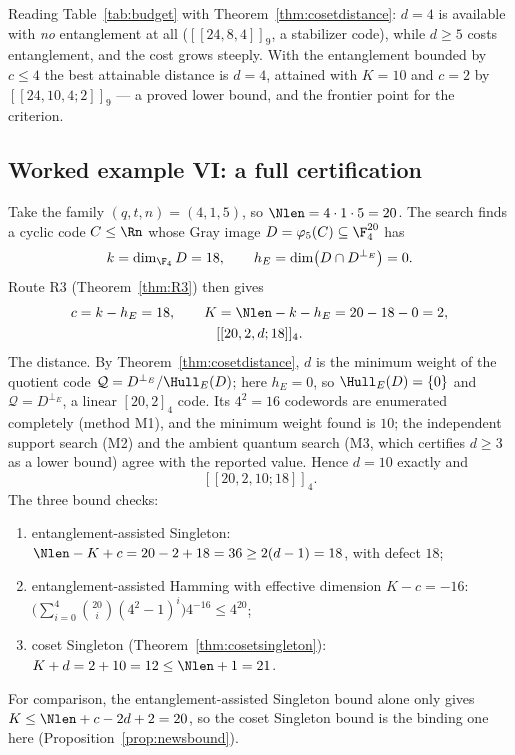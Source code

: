 Reading Table~\ref{tab:budget} with Theorem~\ref{thm:cosetdistance}: $d=4$ is
available with \emph{no} entanglement at all ($[[24,8,4]]_9$, a stabilizer
code), while $d\ge5$ costs entanglement, and the cost grows steeply. With the
entanglement bounded by $c\le4$ the best attainable distance is $d=4$, attained
with $K=10$ and $c=2$ by $[[24,10,4;2]]_9$ --- a proved lower bound, and the
frontier point for the criterion.

\subsection{Worked example VI: a full certification}

\begin{example}\label{ex:certify}
Take the family $(q,t,n)=(4,1,5)$, so $\Nlen=4\cdot1\cdot5=20$. The search
finds a cyclic code $C\le\Rn$ whose Gray image $D=\varphi_5(C)\subseteq
\F_4^{20}$ has
\[
  k=\dim_{\F_4}D=18,\qquad h_E=\dim\bigl(D\cap D^{\perp_E}\bigr)=0 .
\]
Route R3 (Theorem~\ref{thm:R3}) then gives
\[
  \begin{gathered}
    c=k-h_E=18,\qquad K=\Nlen-k-h_E=20-18-0=2,\\
    [[20,2,d;18]]_4 .
  \end{gathered}
\]
The distance. By Theorem~\ref{thm:cosetdistance}, $d$ is the minimum weight of
the quotient code $\mathcal Q=D^{\perp_E}/\Hull_E(D)$; here $h_E=0$, so
$\Hull_E(D)=\{0\}$ and $\mathcal Q=D^{\perp_E}$, a linear $[20,2]_4$ code. Its
$4^2=16$ codewords are enumerated completely (method M1), and the minimum
weight found is $10$; the independent support search (M2) and the ambient
quantum search (M3, which certifies $d\ge3$ as a lower bound) agree with the
reported value. Hence $d=10$ exactly and
\[
  [[20,2,10;18]]_4 .
\]
The three bound checks:
\begin{enumerate}[label=\textnormal{(\roman*)},leftmargin=*]
\item entanglement-assisted Singleton:
  $\Nlen-K+c=20-2+18=36\ge2(d-1)=18$, with defect $18$;
\item entanglement-assisted Hamming with effective dimension $K-c=-16$:
  $\bigl(\sum_{i=0}^{4}\binom{20}{i}(4^2-1)^i\bigr)4^{-16}\le4^{20}$;
\item coset Singleton (Theorem~\ref{thm:cosetsingleton}):
  $K+d=2+10=12\le\Nlen+1=21$.
\end{enumerate}
For comparison, the entanglement-assisted Singleton bound alone only gives
$K\le\Nlen+c-2d+2=20$, so the coset Singleton bound is the binding one here
(Proposition~\ref{prop:newsbound}).


\end{example}
